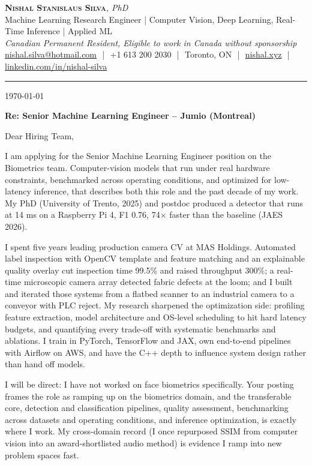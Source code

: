 \documentclass[11pt]{article}
\newcommand{\clName}{Nishal Stanislaus Silva}
\newcommand{\clStatus}{Canadian Permanent Resident, Eligible to work in Canada without sponsorship}
\newcommand{\clTagline}{Machine Learning Research Engineer | Computer Vision, Deep Learning, Real-Time Inference | Applied ML}
\newcommand{\clRole}{Senior Machine Learning Engineer}
\newcommand{\clCompany}{Jumio}
\newcommand{\clTeam}{the Biometrics team}
\begin{document}
\pagestyle{empty}
\begin{center}
    {\LARGE \scshape \textbf{\clName}}{\large \textit{, PhD}}
    \\[1pt]
    {\small \clTagline}
    \\[1pt]
    {\footnotesize\textit{\clStatus}}
    \\[1pt]
    {\small
    \href{mailto:nishal.silva@hotmail.com}{nishal.silva@hotmail.com}
    \,\,|\,\, +1 613 200 2030
    \,\,|\,\, Toronto, ON
    \,\,|\,\, \href{https://nishal.xyz}{nishal.xyz}
    \,\,|\,\, \href{https://www.linkedin.com/in/nishal-silva}{linkedin.com/in/nishal-silva}}
\end{center}

\rule{\linewidth}{0.4pt}\vspace{0.6em}

\today

\textbf{Re: \clRole{} -- \clCompany{} (Montreal)}

Dear Hiring Team,

I am applying for the \clRole{} position on \clTeam{}. Computer-vision models that run under real hardware constraints, benchmarked across operating conditions, and optimized for low-latency inference, that describes both this role and the past decade of my work. My PhD (University of Trento, 2025) and postdoc produced a detector that runs at 14 ms on a Raspberry Pi 4, F1 0.76, 74$\times$ faster than the baseline (JAES 2026).

I spent five years leading production camera CV at MAS Holdings. Automated label inspection with OpenCV template and feature matching and an explainable quality overlay cut inspection time 99.5\% and raised throughput 300\%; a real-time microscopic camera array detected fabric defects at the loom; and I built and iterated those systems from a flatbed scanner to an industrial camera to a conveyor with PLC reject. My research sharpened the optimization side: profiling feature extraction, model architecture and OS-level scheduling to hit hard latency budgets, and quantifying every trade-off with systematic benchmarks and ablations. I train in PyTorch, TensorFlow and JAX, own end-to-end pipelines with Airflow on AWS, and have the C++ depth to influence system design rather than hand off models.

I will be direct: I have not worked on face biometrics specifically. Your posting frames the role as ramping up on the biometrics domain, and the transferable core, detection and classification pipelines, quality assessment, benchmarking across datasets and operating conditions, and inference optimization, is exactly where I work. My cross-domain record (I once repurposed SSIM from computer vision into an award-shortlisted audio method) is evidence I ramp into new problem spaces fast.
\end{document}
